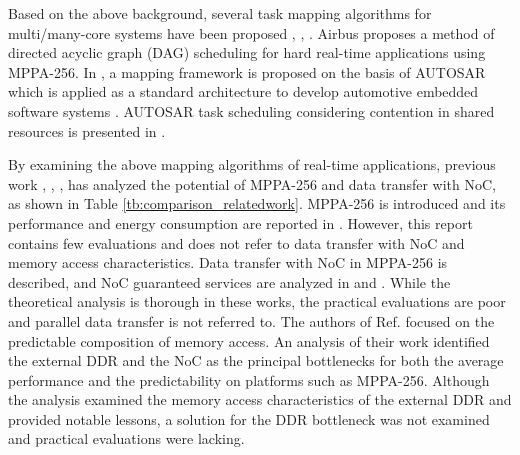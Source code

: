 Based on the above background, several task mapping algorithms for multi/many-core systems have been proposed \cite{carle2014static}, \cite{faragardi2014communication}, \cite{perret2016mapping}.
Airbus \cite{perret2016mapping} proposes a method of directed acyclic graph (DAG) scheduling for hard real-time applications using MPPA-256.
In \cite{faragardi2014communication}, a mapping framework is proposed on the basis of AUTOSAR which is applied as a standard architecture to develop automotive embedded software systems \cite{furst2009autosar}.
AUTOSAR task scheduling considering contention in shared resources is presented in \cite{becker2016contention}.

By examining the above mapping algorithms of real-time applications, previous work \cite{deDinechin2014GSN}, \cite{denet2017work}, \cite{kanter2015kalray}, \cite{perret2016predictable} has analyzed the potential of MPPA-256 and data transfer with NoC, as shown in Table \ref{tb:comparison_relatedwork}.
MPPA-256 is introduced and its performance and energy consumption are reported in \cite{kanter2015kalray}.
However, this report contains few evaluations and does not refer to data transfer with NoC and memory access characteristics.
Data transfer with NoC in MPPA-256 is described, and NoC guaranteed services are analyzed in \cite{deDinechin2014GSN} and \cite{denet2017work}.
While the theoretical analysis is thorough in these works, the practical evaluations are poor and parallel data transfer is not referred to.
The authors of Ref. \cite{perret2016predictable} focused on the predictable composition of memory access.
An analysis of their work identified the external DDR and the NoC as the principal bottlenecks for both the average performance and the predictability on platforms such as MPPA-256.
Although the analysis examined the memory access characteristics of the external DDR and provided notable lessons, a solution for the DDR bottleneck was not examined and practical evaluations were lacking.

